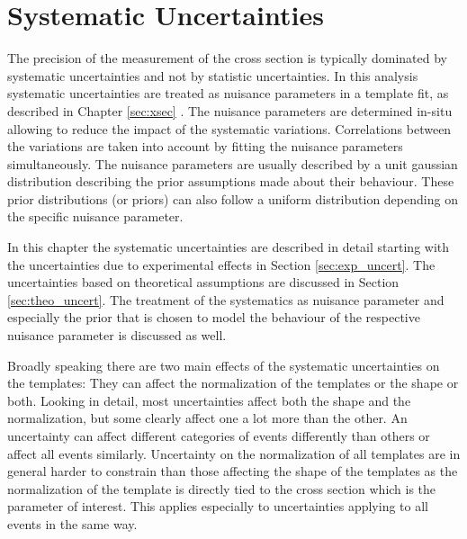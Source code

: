 
\chapter{Systematic Uncertainties}
\label{sec:syst_uncert}

The precision of the measurement of the \ttbar cross section is typically dominated by systematic uncertainties and not by statistic uncertainties.
In this analysis systematic uncertainties are treated as nuisance parameters in a
template fit, as described in Chapter \ref{sec:xsec} . The nuisance parameters are determined in-situ allowing to reduce the impact of the systematic variations. 
Correlations between the variations are taken into account by fitting the nuisance parameters simultaneously.
The nuisance parameters are usually described by a unit gaussian distribution describing the prior assumptions made about their behaviour.
These prior distributions (or priors) can also follow a uniform distribution depending on the specific nuisance parameter.

In this chapter the systematic uncertainties are described in detail starting with the uncertainties due to experimental effects in Section \ref{sec:exp_uncert}.
The uncertainties based on theoretical assumptions are discussed in Section \ref{sec:theo_uncert}. The treatment of the systematics as nuisance
parameter and especially the prior that is chosen to model the behaviour of the respective nuisance parameter is discussed as well.

Broadly speaking there are two main effects of the systematic uncertainties on the templates: They can affect the normalization of the templates or the shape or both.
Looking in detail, most uncertainties affect both the shape and the normalization, but some clearly affect one a lot more than the other.
An uncertainty can affect different categories of events differently than others or affect all events similarly.
Uncertainty on the normalization of all templates are in general harder to constrain than those affecting the shape of the templates as the normalization of the
\ttbar template is directly tied to the cross section which is the parameter of interest. This applies especially to uncertainties applying to all events in the same way.


